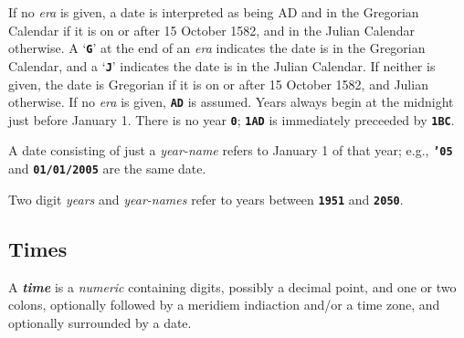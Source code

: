 \documentclass[12pt]{article}
\newcommand{\TT}[1]{{\tt \bfseries #1}}
\newcommand{\key}[1]{{\bf \em #1}\index{#1}}
\begin{document}
If no {\em era} is given, a date is interpreted as being AD and in the
Gregorian Calendar if it is on or after 15 October 1582, and
in the Julian Calendar otherwise.
A `\TT{G}' at the end of an {\em era} indicates the date is in the
Gregorian Calendar, and a `\TT{J}' indicates the date is in the Julian
Calendar.  If neither is given, the date is Gregorian if it is on
or after 15 October 1582, and Julian otherwise.  If no {\em era}
is given, \TT{AD} is assumed.  Years always begin at the midnight just
before January 1.  There is no year \TT{0}; \TT{1AD} is immediately preceeded
by \TT{1BC}.

A date consisting of just a {\em year-name} refers to January 1 of that
year; e.g., \TT{'05} and \TT{01/01/2005} are the same date.

Two digit {\em years} and {\em year-names} refer to years between
\TT{1951} and \TT{2050}.

\subsection{Times}

A \key{time} is a {\em numeric} containing digits, possibly a decimal
point, and one or two colons, optionally followed by a meridiem indiaction
and/or a time zone, and optionally surrounded by a date.
\end{document}
